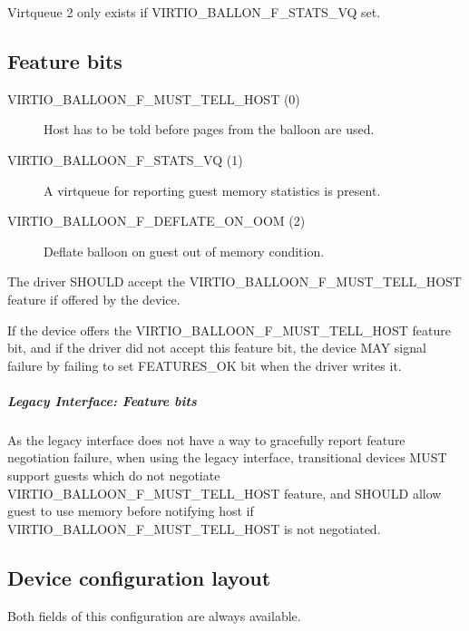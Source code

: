   Virtqueue 2 only exists if VIRTIO_BALLON_F_STATS_VQ set.

\subsection{Feature bits}\label{sec:Device Types / Memory Balloon Device / Feature bits}
\begin{description}
\item[VIRTIO_BALLOON_F_MUST_TELL_HOST (0)] Host has to be told before
    pages from the balloon are used.

\item[VIRTIO_BALLOON_F_STATS_VQ (1)] A virtqueue for reporting guest
    memory statistics is present.
\item[VIRTIO_BALLOON_F_DEFLATE_ON_OOM (2) ] Deflate balloon on
    guest out of memory condition.

\end{description}

The driver SHOULD accept the VIRTIO_BALLOON_F_MUST_TELL_HOST
feature if offered by the device.

If the device offers the VIRTIO_BALLOON_F_MUST_TELL_HOST feature
bit, and if the driver did not accept this feature bit, the
device MAY signal failure by failing to set FEATURES_OK
 bit when the driver writes it.
\subparagraph{Legacy Interface: Feature bits}\label{sec:Device
Types / Memory Balloon Device / Feature bits / Legacy Interface:
Feature bits}
As the legacy interface does not have a way to gracefully report feature
negotiation failure, when using the legacy interface,
transitional devices MUST support guests which do not negotiate
VIRTIO_BALLOON_F_MUST_TELL_HOST feature, and SHOULD
allow guest to use memory before notifying host if
VIRTIO_BALLOON_F_MUST_TELL_HOST is not negotiated.

\subsection{Device configuration layout}\label{sec:Device Types / Memory Balloon Device / Device configuration layout}
  Both fields of this configuration
  are always available.

